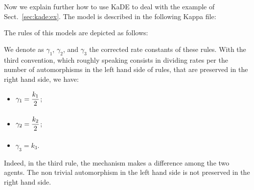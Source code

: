 \documentclass[11pt]{book}
\def\KaDE{\textsf{KaDE}}
\begin{document}
Now we explain further how to use {\KaDE} to deal with the example of Sect.~\ref{sec:kade:ex}.
The model is described in the following Kappa file:


The rules of this models are depicted as follows:

\begin{center}
\begin{minipage}{0.49\linewidth}
    \centering{}
  \end{minipage}


\begin{minipage}{0.49\linewidth}
  \centering{}
\end{minipage}


\begin{minipage}{0.49\linewidth}
    \centering{}
  \end{minipage}

\end{center}

We denote as $\gamma_1$, $\gamma_2$, and $\gamma_3$ the corrected rate constants of these rules. With the third convention, which roughly speaking consists in dividing rates per the number of automorphisms in the left hand side of rules, that are preserved in the right hand side, we have:
\begin{itemize}
  \item $\gamma_1 = \frac{\strut \displaystyle k_1}{\strut \displaystyle 2}$;
  \item $\gamma_2 = \frac{\strut \displaystyle k_2}{\strut \displaystyle 2}$;
  \item $\gamma_3 = k_3$.
\end{itemize}
Indeed, in the third rule, the mechanism makes a difference among the two agents. The non trivial automorphism in the left hand side is not preserved in the right hand side.
\end{document}

